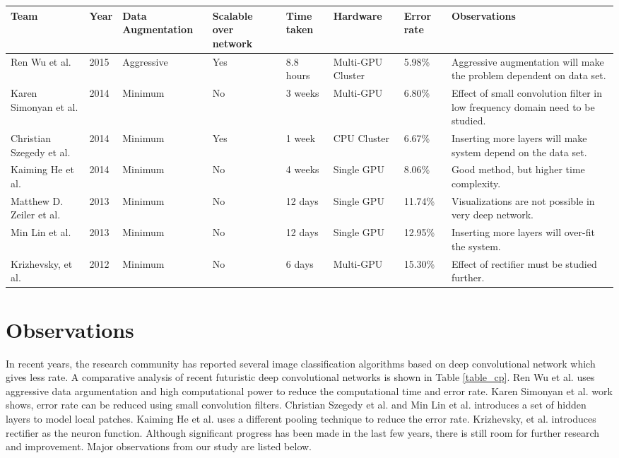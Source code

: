\documentclass{llncs}
\begin{document}
\begin{table*}[t]
\captionsetup{justification=centering,belowskip=1pt,aboveskip=1pt}
\caption[]{ Comparative analysis of state-of-the-art deep convolutional network based image classification algorithms using ILSVRC dataset.}
 \begin{tabular}{ | p{2cm} | p{.7cm} | p{1.5cm} |p{1.5cm} |p{1cm} |p{1.5cm} |p{1.1cm} |p{3cm}|}

    \hline
Team	&Year	&Data Augmentation	&Scalable over network	&Time taken	&Hardware	&Error rate &Observations
\\ 
\hline

Ren Wu et al. \cite{Wu2015}&2015&Aggressive&Yes&8.8 hours&Multi-GPU Cluster&5.98\%&Aggressive augmentation  will make the problem dependent on data set.\\
\hline
Karen Simonyan et al. \cite{Arge2015}&2014&Minimum&No&3 weeks&Multi-GPU&6.80\% &Effect of small convolution filter in low frequency domain need to be studied.\\
\hline
Christian Szegedy et al. \cite{Szegedy}&2014&Minimum&Yes&1 week&CPU Cluster&6.67\% &Inserting more layers will make system depend on the data set.\\
\hline
Kaiming He et al. \cite{He2014}&2014&Minimum&No&4 weeks	&Single GPU	&8.06\% &Good method, but higher time complexity.\\
\hline
Matthew D. Zeiler et al. \cite{Zeiler2013}&2013&Minimum&No&12 days&Single GPU&11.74\% & Visualizations are not possible in very deep network.\\
\hline
Min Lin et al. \cite{Lin2013}&2013&Minimum&No&12 days&Single GPU&12.95\% &Inserting more layers will over-fit the system.\\
\hline
Krizhevsky, et al.\cite{Krizhevsky2012a}&2012&Minimum&No&6 days	&Multi-GPU&15.30\%&Effect of rectifier must be studied further.\\
\hline
\end{tabular}
\label{table_cp}
\end{table*}
 \section {Observations}
\vspace*{-3mm}
In recent years, the research community has reported several image classification algorithms based on deep convolutional network which gives less rate. A comparative analysis of recent futuristic deep convolutional networks is shown in Table \ref{table_cp}.
  Ren Wu et al. \cite{Wu2015} uses aggressive data argumentation and high computational power to reduce the computational time and error rate. Karen Simonyan et al. \cite{Arge2015} work shows, error rate can be reduced using small convolution filters. Christian Szegedy  et al. \cite{Szegedy} and Min Lin et al. \cite{Lin2013} introduces a set of hidden layers to model local patches. Kaiming He et al. \cite{He2014} uses a different pooling technique to reduce the error rate. Krizhevsky, et al. \cite{Krizhevsky2012a}  introduces  rectifier  as the neuron function. Although significant progress has been made in the last few years, there is still room for further research and improvement. Major observations from our study are listed below.
\end{document}
